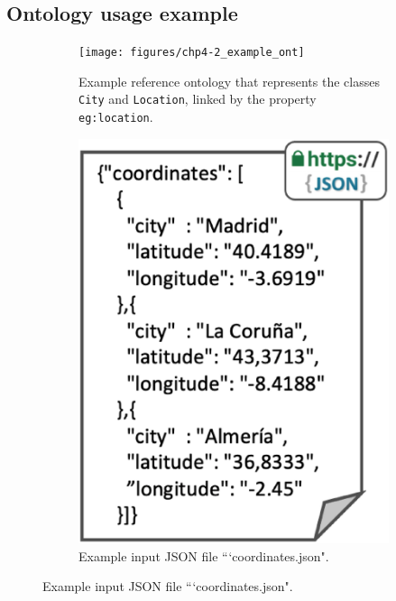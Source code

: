 \subsection{Ontology usage example}\label{sec:cm_example} 



\begin{figure}[t!]
    \centering
    \begin{subfigure}[b]{0.45\linewidth}
        \centering
    	\texttt{[image: figures/chp4-2\_example\_ont]}
    	\caption{Example reference ontology that represents the classes \texttt{City} and \texttt{Location}, linked by the property \texttt{eg:location}.}
    	\label{fig:chp4-2_chp4_ex_onto}
    \end{subfigure}
    \begin{subfigure}[b]{0.28\linewidth}
        \centering
    	\includegraphics[width=1\linewidth]{figures/chp4-2_example_json}
    	\caption{Example input JSON file ```coordinates.json".}
    	\label{fig:chp4-2_chp4_ex_json}

\end{subfigure}
\end{figure}
